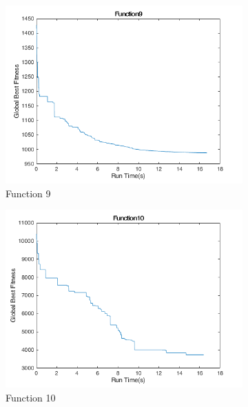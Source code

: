 \begin{figure}
  \centering
  \begin{subfigure}[b]{0.4\textwidth}
    \includegraphics[width=\textwidth]{img/cecrt/f9}
    \caption{Function 9}
  \end{subfigure}
  \begin{subfigure}[b]{0.4\textwidth}
    \includegraphics[width=\textwidth]{img/cecrt/f10}
    \caption{Function 10}
  \end{subfigure}
  \begin{subfigure}[b]{0.4\textwidth}

\end{subfigure}
\end{figure}
